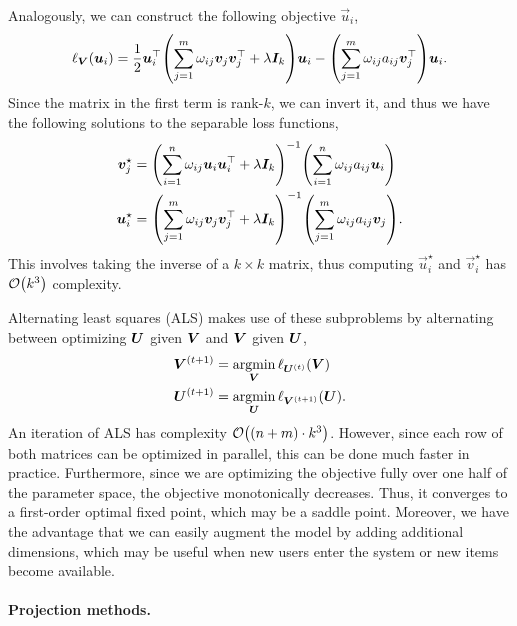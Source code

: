 Analogously, we can construct the following objective \wrt $\vec{u}_i$, \[
    \ell_{\mat{V}}(\vec{u}_i) = \frac{1}{2} \transpose{\vec{u}_i} \lft( \sum_{j=1}^{m} \omega_{ij} \vec{v}_j \transpose{\vec{v}_j} + \lambda \mat{I}_k \rgt) \vec{u}_i - \lft( \sum_{j=1}^{m} \omega_{ij} a_{ij} \transpose{\vec{v}_j} \rgt) \vec{u}_i.
\]
Since the matrix in the first term is rank-$k$, we can invert it, and thus we have the following
solutions to the separable loss functions,
\begin{align*}
    \vec{v}_j^\star & = \inv{\lft( \sum_{i=1}^{n} \omega_{ij} \vec{u}_i \transpose{\vec{u}_i} + \lambda \mat{I}_k \rgt)} \lft( \sum_{i=1}^{n} \omega_{ij} a_{ij} \vec{u}_i \rgt)  \\
    \vec{u}_i^\star & = \inv{\lft( \sum_{j=1}^{m} \omega_{ij} \vec{v}_j \transpose{\vec{v}_j} + \lambda \mat{I}_k \rgt)} \lft( \sum_{j=1}^{m} \omega_{ij} a_{ij} \vec{v}_j \rgt).
\end{align*}
This involves taking the inverse of a $k\times k$ matrix, thus computing $\vec{u}_i^\star$ and
$\vec{v}_i^\star$ has $\bigo{k^3}$ complexity.

Alternating least squares (ALS) makes use of these subproblems by alternating between optimizing
$\bm{U}$ given $\bm{V}$ and $\bm{V}$ given $\bm{U}$,
\begin{align*}
    \bm{V}^{(t+1)} & = \operatorname*{argmin}_{\bm{V}} \ell_{\bm{U}^{(t)}}(\bm{V})    \\
    \bm{U}^{(t+1)} & = \operatorname*{argmin}_{\bm{U}} \ell_{\bm{V}^{(t+1)}}(\bm{U}).
\end{align*}
An iteration of ALS has complexity $\bigo{(n+m)\cdot k^3}$. However, since each row of both matrices can be
optimized in parallel, this can be done much faster in practice. Furthermore, since we are optimizing
the objective fully over one half of the parameter space, the objective monotonically decreases.
Thus, it converges to a first-order optimal fixed point, which may be a saddle point. Moreover, we
have the advantage that we can easily augment the model by adding additional dimensions, which may be
useful when new users enter the system or new items become available.

\paragraph{Projection methods.}

